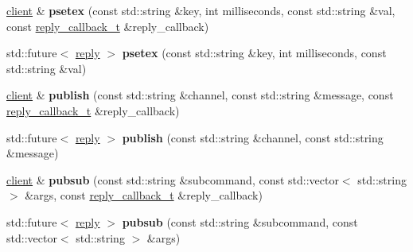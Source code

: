 \begin{DoxyCompactItemize}
\item 
\mbox{\label{classcpp__redis_1_1client_a732ba849342f9d8c67111f6cb6cb198c}} 
\mbox{\hyperlink{classcpp__redis_1_1client}{client}} \& {\bfseries psetex} (const std\+::string \&key, int milliseconds, const std\+::string \&val, const \mbox{\hyperlink{classcpp__redis_1_1client_af7a65eb21aa25230bfbb0b0203c4fc04}{reply\+\_\+callback\+\_\+t}} \&reply\+\_\+callback)
\item 
\mbox{\label{classcpp__redis_1_1client_a69712c925c1496ab9531a5fd1888ad93}} 
std\+::future$<$ \mbox{\hyperlink{classcpp__redis_1_1reply}{reply}} $>$ {\bfseries psetex} (const std\+::string \&key, int milliseconds, const std\+::string \&val)
\item 
\mbox{\label{classcpp__redis_1_1client_a1fba121a3d6e50811448e35917badfc6}} 
\mbox{\hyperlink{classcpp__redis_1_1client}{client}} \& {\bfseries publish} (const std\+::string \&channel, const std\+::string \&message, const \mbox{\hyperlink{classcpp__redis_1_1client_af7a65eb21aa25230bfbb0b0203c4fc04}{reply\+\_\+callback\+\_\+t}} \&reply\+\_\+callback)
\item 
\mbox{\label{classcpp__redis_1_1client_ad9a8434b4ca46e185bab45cf135c9ac2}} 
std\+::future$<$ \mbox{\hyperlink{classcpp__redis_1_1reply}{reply}} $>$ {\bfseries publish} (const std\+::string \&channel, const std\+::string \&message)
\item 
\mbox{\label{classcpp__redis_1_1client_a4c606e08e8787971044b76930b99f30d}} 
\mbox{\hyperlink{classcpp__redis_1_1client}{client}} \& {\bfseries pubsub} (const std\+::string \&subcommand, const std\+::vector$<$ std\+::string $>$ \&args, const \mbox{\hyperlink{classcpp__redis_1_1client_af7a65eb21aa25230bfbb0b0203c4fc04}{reply\+\_\+callback\+\_\+t}} \&reply\+\_\+callback)
\item 
\mbox{\label{classcpp__redis_1_1client_a9f5ae4ef589038af3f7e8304a56446e2}} 
std\+::future$<$ \mbox{\hyperlink{classcpp__redis_1_1reply}{reply}} $>$ {\bfseries pubsub} (const std\+::string \&subcommand, const std\+::vector$<$ std\+::string $>$ \&args)
\item 
\mbox{\label{classcpp__redis_1_1client_a2f10778d114d8144416b09645a7c6416}} 

\end{DoxyCompactItemize}
